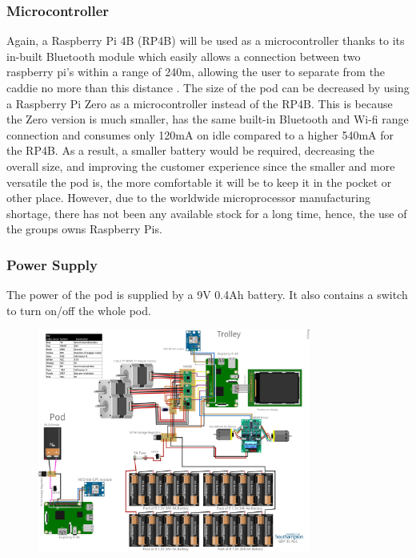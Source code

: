 \documentclass[11pt,landscape]{article}
\begin{document}
\begin{multicols}{3}
\subsubsection{Microcontroller}
Again, a Raspberry Pi 4B (RP4B) will be used as a microcontroller thanks to its
in-built Bluetooth module which easily allows a connection between two raspberry
pi’s within a range of 240m, allowing the user to separate from the caddie no
more than this distance \cite{raspi}.
The size of the pod can be decreased by using a Raspberry Pi Zero as a
microcontroller instead of the RP4B. This is because the Zero version is much
smaller, has the same built-in Bluetooth and Wi-fi range connection and consumes
only 120mA on idle compared to a higher 540mA for the RP4B. As a result, a
smaller battery would be required, decreasing the overall size, and improving
the customer experience since the smaller and more versatile the pod is, the
more comfortable it will be to keep it in the pocket or other place. However,
due to the worldwide microprocessor manufacturing shortage, there has not been
any available stock for a long time, hence, the use of the groups owns Raspberry
Pis. 

\subsubsection{Power Supply}
The power of the pod is supplied by a 9V 0.4Ah battery. It also contains a
switch to turn on/off the whole pod.

\end{multicols}

\begin{figure}
    \begin{center}
    \includegraphics[width=0.8\textwidth]{electrical_schematic.png}
    \label{fig:electrical_schematic}
    \end{center}
\end{figure}
\end{document}
